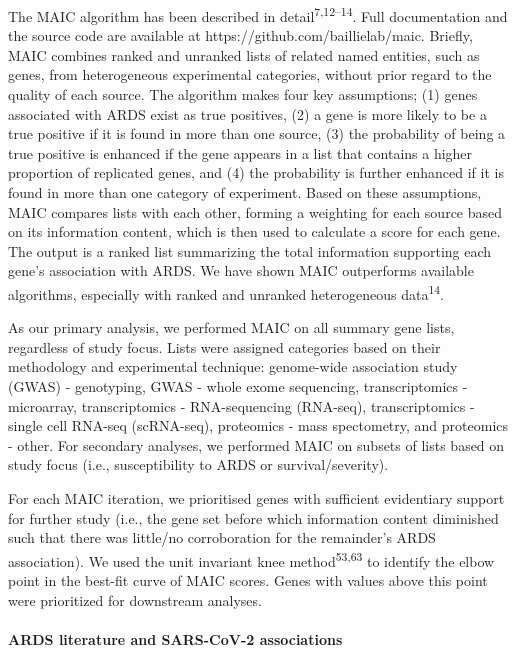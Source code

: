 \documentclass[
  11,
  a4paper,
]{article}
\let\oldparagraph\paragraph
\renewcommand{\paragraph}[1]{\oldparagraph{#1}\mbox{}}
\begin{document}
The MAIC algorithm has been described in
detail\textsuperscript{7,12--14}. Full documentation and the source code
are available at https://github.com/baillielab/maic. Briefly, MAIC
combines ranked and unranked lists of related named entities, such as
genes, from heterogeneous experimental categories, without prior regard
to the quality of each source. The algorithm makes four key assumptions;
(1) genes associated with ARDS exist as true positives, (2) a gene is
more likely to be a true positive if it is found in more than one
source, (3) the probability of being a true positive is enhanced if the
gene appears in a list that contains a higher proportion of replicated
genes, and (4) the probability is further enhanced if it is found in
more than one category of experiment. Based on these assumptions, MAIC
compares lists with each other, forming a weighting for each source
based on its information content, which is then used to calculate a
score for each gene. The output is a ranked list summarizing the total
information supporting each gene's association with ARDS. We have shown
MAIC outperforms available algorithms, especially with ranked and
unranked heterogeneous data\textsuperscript{14}.

As our primary analysis, we performed MAIC on all summary gene lists,
regardless of study focus. Lists were assigned categories based on their
methodology and experimental technique: genome-wide association study
(GWAS) - genotyping, GWAS - whole exome sequencing, transcriptomics -
microarray, transcriptomics - RNA-sequencing (RNA-seq), transcriptomics
- single cell RNA-seq (scRNA-seq), proteomics - mass spectometry, and
proteomics - other. For secondary analyses, we performed MAIC on subsets
of lists based on study focus (i.e., susceptibility to ARDS or
survival/severity).

For each MAIC iteration, we prioritised genes with sufficient
evidentiary support for further study (i.e., the gene set before which
information content diminished such that there was little/no
corroboration for the remainder's ARDS association). We used the unit
invariant knee method\textsuperscript{53,63} to identify the elbow point
in the best-fit curve of MAIC scores. Genes with values above this point
were prioritized for downstream analyses.

\hypertarget{ards-literature-and-sars-cov-2-associations}{%
\paragraph{ARDS literature and SARS-CoV-2
associations}\label{ards-literature-and-sars-cov-2-associations}}
\end{document}

